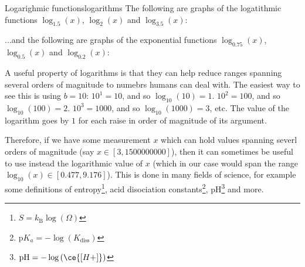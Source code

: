 \begin{example}{Logarighmic functions}{logarithms}
	The following are graphs of the logatithmic functions \textcolor{xred}{${\log_{1.5}(x)}$}, \textcolor{xblue}{${\log_{2}(x)}$} and \textcolor{xgreen}{${\log_{3.5}(x)}$}:
	\begin{figure}[H]
		\centering
	\end{figure}

	...and the following are graphs of the exponential functions \textcolor{xpurple}{$\log_{0.75}(x)$}, \textcolor{xorange}{$\log_{0.5}(x)$} and $\log_{0.2}(x)$:
	\begin{figure}[H]
		\centering
	\end{figure}
\end{example}

A useful property of logarithms is that they can help reduce ranges spanning several orders of magnitude to numebrs humans can deal with. The easiest way to see this is using $b=10$: $10^{1}=10$, and so $\log_{10}(10)=1$. $10^{2}=100$, and so $\log_{10}(100)=2$. $10^{3}=1000$, and so $\log_{10}(1000)=3$, etc. The value of the logarithm goes by $1$ for each raise in order of magnitude of its argument.

Therefore, if we have some measurement $x$ which can hold values spanning severl orders of magnitude (say $x\in[3,1500000000]$), then it can sometimes be useful to use instead the logarithmic value of $x$ (which in our case would span the range $\log_{10}(x)\in[0.477,9.176]$). This is done in many fields of science, for example some definitions of entropy\footnote{$S=k_{\text{B}}\log\left( \Omega \right)$}, acid disociation constants\footnote{$\text{p}K_{a}=-\log\left( K_{\text{diss}} \right)$}, pH\footnote{$\text{pH}=-\log\left(\ce{[H+]}\right)$} and more.

